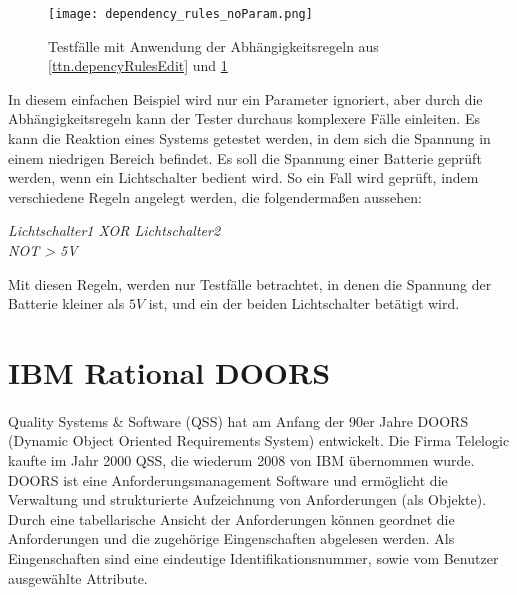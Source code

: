 \begin{figure}[h]
  \begin{center}
    \texttt{[image: dependency\_rules\_noParam.png]}
  		  \caption{Testfälle mit Anwendung der Abhängigkeitsregeln aus \ref{ttn.depencyRulesEdit} und \ref{ttn.depencyRules}}
     \label{ttn.depencyRules}
  \end{center}
\end{figure}

In diesem einfachen Beispiel wird nur ein Parameter ignoriert, aber durch die Abhängigkeitsregeln kann der Tester durchaus komplexere Fälle einleiten. Es kann die Reaktion eines Systems getestet werden, in dem sich die Spannung in einem niedrigen Bereich befindet. Es soll die Spannung einer Batterie geprüft werden, wenn ein Lichtschalter bedient wird. So ein Fall wird geprüft, indem verschiedene Regeln angelegt werden, die folgendermaßen aussehen:

\begin{center}
\textit{Lichtschalter1 XOR Lichtschalter2}\\
\textit{NOT > 5V}
\end{center}

Mit diesen Regeln, werden nur Testfälle betrachtet, in denen die Spannung der Batterie kleiner als $5V$ ist, und ein der beiden Lichtschalter betätigt wird.





\newpage
\section{IBM Rational DOORS}\label{sec:DOORS}
\paragraph{}

Quality Systems \& Software (QSS) hat am Anfang der 90er Jahre DOORS (Dynamic Object Oriented Requirements System) entwickelt. Die Firma Telelogic kaufte im Jahr 2000 QSS, die wiederum 2008 von IBM übernommen wurde. DOORS ist eine Anforderungsmanagement Software und ermöglicht die Verwaltung und strukturierte Aufzeichnung von Anforderungen (als Objekte). Durch eine tabellarische Ansicht der Anforderungen können geordnet die Anforderungen und die zugehörige Eingenschaften abgelesen werden. Als Eingenschaften sind eine eindeutige Identifikationsnummer, sowie vom Benutzer ausgewählte Attribute.\\


